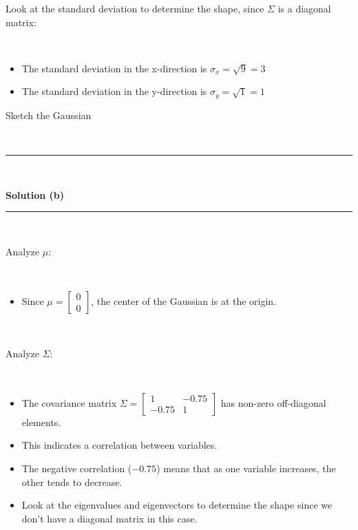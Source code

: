 \documentclass{article}
\begin{document}
\parbox{\textwidth}{Look at the standard deviation to determine the shape, since $\Sigma$ is a diagonal matrix:}\\ 

\begin{itemize}
    \item The standard deviation in the x-direction is $\sigma_x = \sqrt{9} = 3$
    \item The standard deviation in the y-direction is $\sigma_y = \sqrt{1} = 1$
\end{itemize}

\parbox{\textwidth}{Sketch the Gaussian}\\

\begin{center}
\end{center}

\noindent\rule{\textwidth}{0.4pt}\\

\parbox{\textwidth}{\textbf{Solution (b)}}

\noindent\rule{\textwidth}{0.4pt}\\

\parbox{\textwidth}{Analyze $\mu$:}\\
\begin{itemize}
    \item \parbox{\textwidth}{Since $\mu = \begin{bmatrix} 0 \\ 0 \end{bmatrix}$, the center of the Gaussian is at the origin.}\\
\end{itemize}

\parbox{\textwidth}{Analyze $\Sigma$:}\\

\begin{itemize}
    \item The covariance matrix $\Sigma = \begin{bmatrix} 1 & -0.75 \\ -0.75 & 1 \end{bmatrix}$ has non-zero off-diagonal elements.
    \item This indicates a correlation between variables. 
    \item The negative correlation ($-0.75$) means that as one variable increases, the other tends to decrease.\\
    \item Look at the eigenvalues and eigenvectors to determine the shape since we don't have a diagonal matrix in this case.
\end{itemize}
\end{document}
